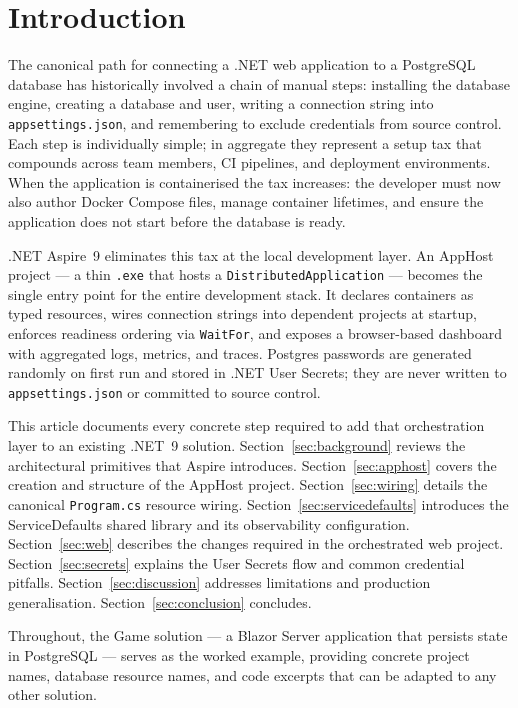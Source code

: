 \section{Introduction}
\label{sec:introduction}

The canonical path for connecting a .NET web application to a PostgreSQL database has historically involved a chain of manual steps: installing the database engine, creating a database and user, writing a connection string into \texttt{appsettings.json}, and remembering to exclude credentials from source control. Each step is individually simple; in aggregate they represent a setup tax that compounds across team members, CI pipelines, and deployment environments. When the application is containerised the tax increases: the developer must now also author Docker Compose files, manage container lifetimes, and ensure the application does not start before the database is ready.

.NET Aspire~9 eliminates this tax at the local development layer. An AppHost project --- a thin \texttt{.exe} that hosts a \texttt{DistributedApplication} --- becomes the single entry point for the entire development stack. It declares containers as typed resources, wires connection strings into dependent projects at startup, enforces readiness ordering via \texttt{WaitFor}, and exposes a browser-based dashboard with aggregated logs, metrics, and traces. Postgres passwords are generated randomly on first run and stored in .NET User Secrets; they are never written to \texttt{appsettings.json} or committed to source control.

This article documents every concrete step required to add that orchestration layer to an existing .NET~9 solution. Section~\ref{sec:background} reviews the architectural primitives that Aspire introduces. Section~\ref{sec:apphost} covers the creation and structure of the AppHost project. Section~\ref{sec:wiring} details the canonical \texttt{Program.cs} resource wiring. Section~\ref{sec:servicedefaults} introduces the ServiceDefaults shared library and its observability configuration. Section~\ref{sec:web} describes the changes required in the orchestrated web project. Section~\ref{sec:secrets} explains the User Secrets flow and common credential pitfalls. Section~\ref{sec:discussion} addresses limitations and production generalisation. Section~\ref{sec:conclusion} concludes.

Throughout, the Game solution --- a Blazor Server application that persists state in PostgreSQL --- serves as the worked example, providing concrete project names, database resource names, and code excerpts that can be adapted to any other solution.
